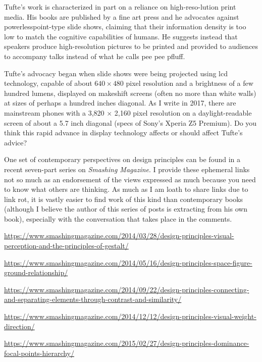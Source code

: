 Tufte's work is characterized in part on a reliance on high-reso-lution
print media. His books are published by a fine art press and he
advocates against powerlesspoint-type slide shows, claiming that their
information density is too low to match the cognitive capabilities of
humans. He suggests instead that speakers produce high-resolution
pictures to be printed and provided to audiences to accompany talks
instead of what he calls pee pee pfluff.

Tufte's advocacy began when slide shows were being projected using lcd
technology, capable of about \(640\times 480\) pixel resolution and a
brightness of a few hundred lumens, displayed on makeshift screens
(often no more than white walls) at sizes of perhaps a hundred inches
diagonal. As I write in 2017, there are mainstream phones with a 3,820
\(\times\) 2,160 pixel resolution on a daylight-readable screen of about
a 5.7 inch diagonal (specs of Sony's Xperia Z5 Premium). Do you think
this rapid advance in display technology affects or should affect
Tufte's advice?

\hypertarget{contemporary-perspectives-on-design-principles}{%
\label{contemporary-perspectives-on-design-principles}}

One set of contemporary perspectives on design principles can be found
in a recent seven-part series on \emph{Smashing Magazine}. I provide
these ephemeral links not so much as an endorsement of the views
expressed as much because you need to know what others are thinking. As
much as I am loath to share links due to link rot, it is vastly easier
to find work of this kind than contemporary books (although I believe
the author of this series of posts is extracting from his own book),
especially with the conversation that takes place in the comments.

\url{https://www.smashingmagazine.com/2014/03/28/design-principles-visual-perception-and-the-principles-of-gestalt/}

\url{https://www.smashingmagazine.com/2014/05/16/design-principles-space-figure-ground-relationship/}

\url{https://www.smashingmagazine.com/2014/09/22/design-principles-connecting-and-separating-elements-through-contrast-and-similarity/}

\url{https://www.smashingmagazine.com/2014/12/12/design-principles-visual-weight-direction/}

\url{https://www.smashingmagazine.com/2015/02/27/design-principles-dominance-focal-points-hierarchy/}

